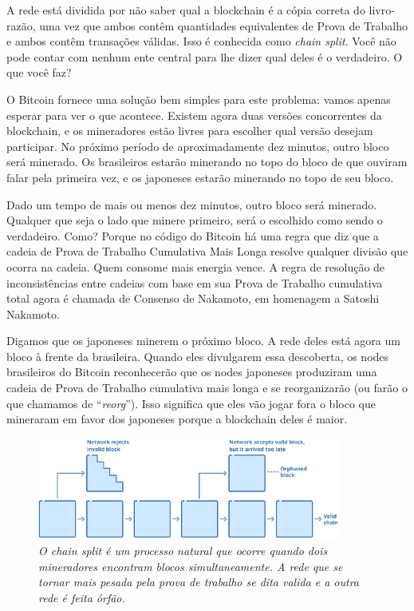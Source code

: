 


A rede está dividida por não saber qual a blockchain é a cópia correta do livro-razão, uma vez que ambos contêm quantidades equivalentes de Prova de Trabalho e ambos contêm transações válidas.
Isso é conhecida como \textit{chain split}.
Você não pode contar com nenhum ente central para lhe dizer qual deles é o verdadeiro.
O que você faz?

O Bitcoin fornece uma solução bem simples para este problema: vamos apenas esperar para ver o que acontece. Existem agora duas versões concorrentes da blockchain, e os mineradores estão livres para escolher qual versão desejam participar. No próximo período de aproximadamente dez minutos, outro bloco será minerado. Os brasileiros estarão minerando no topo do bloco de que ouviram falar pela primeira vez, e os japoneses estarão minerando no topo de seu bloco.

Dado um tempo de mais ou menos dez minutos, outro bloco será minerado.%
Qualquer que seja o lado que minere primeiro, será o escolhido como sendo o verdadeiro. Como? Porque no código do Bitcoin há uma regra que diz que a cadeia de Prova de Trabalho Cumulativa Mais Longa resolve qualquer divisão que ocorra na cadeia. Quem consome mais energia vence. A regra de resolução de inconsistências entre cadeias com base em sua Prova de Trabalho cumulativa total agora é chamada de Consenso de Nakamoto, em homenagem a Satoshi Nakamoto.

Digamos que os japoneses minerem o próximo bloco. A rede deles está agora um bloco à frente da brasileira. Quando eles divulgarem essa descoberta, os nodes brasileiros do Bitcoin reconhecerão que os nodes japoneses produziram uma cadeia de Prova de Trabalho cumulativa mais longa e se reorganizarão (ou farão o que chamamos de “\textit{reorg}”). Isso significa que eles vão jogar fora o bloco que mineraram em favor dos japoneses porque a blockchain deles é maior. 

\begin{figure}[ht]
  \centering
  \includegraphics[width=10cm]{imagens/capitulo6/Capitulo6-Chainsplit.png}
  \caption*{\textit{\small O chain split é um processo natural que ocorre quando dois mineradores encontram blocos simultaneamente. A rede que se tornar mais pesada pela prova de trabalho se dita valida e a outra rede é feita órfão.}}
\end{figure}

